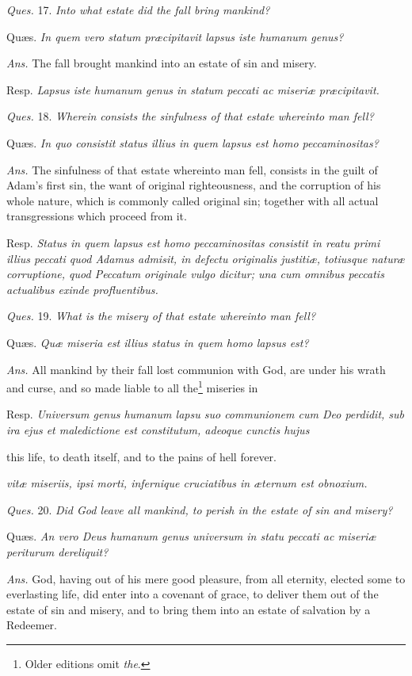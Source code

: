\emph{Ques.} 17. \emph{Into what estate did the fall bring mankind?}

Quæs. \emph{In quem vero statum præcipitavit lapsus iste humanum genus?}

\emph{Ans.} The fall brought mankind into an estate of sin and misery.

Resp. \emph{Lapsus iste humanum genus in statum peccati ac miseriæ præcipitavit.}

\emph{Ques.} 18. \emph{Wherein consists the sinfulness of that estate whereinto man fell?}

Quæs. \emph{In quo consistit status illius in quem lapsus est homo peccaminositas?}

\emph{Ans.} The sinfulness of that estate whereinto man fell, consists in the guilt of Adam's first sin, the want of original righteousness, and the corruption of his whole nature, which is commonly called original sin; together with all actual transgressions which proceed from it.

Resp. \emph{Status in quem lapsus est homo peccaminositas consistit in reatu primi illius peccati quod Adamus admisit, in defectu originalis justitiæ, totiusque naturæ corruptione, quod Peccatum originale vulgo dicitur; una cum omnibus peccatis actualibus exinde profluentibus.}

\emph{Ques.} 19. \emph{What is the misery of that estate whereinto man fell?}

Quæs. \emph{Quæ miseria est illius status in quem homo lapsus est?}

\emph{Ans.} All mankind by their fall lost communion with God, are under his wrath and curse, and so made liable to all the\footnote{Older editions omit \emph{the}.} miseries in

Resp. \emph{Universum genus humanum lapsu suo communionem cum Deo perdidit, sub ira ejus et maledictione est constitutum, adeoque cunctis hujus }

this life, to death itself, and to the pains of hell forever.

\emph{vitæ miseriis, ipsi morti, infernique cruciatibus in æternum est obnoxium.}

\emph{Ques.} 20. \emph{Did God leave all mankind, to perish in the estate of sin and misery?}

Quæs. \emph{An vero Deus humanum genus universum in statu peccati ac miseriæ periturum dereliquit?}

\emph{Ans.} God, having out of his mere good pleasure, from all eternity, elected some to everlasting life, did enter into a covenant of grace, to deliver them out of the estate of sin and misery, and to bring them into an estate of salvation by a Redeemer.

